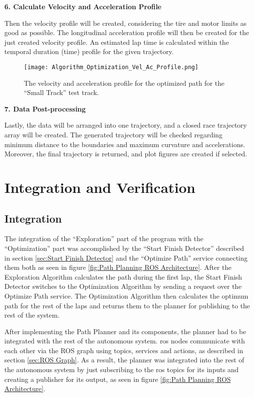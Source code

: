 \textbf{6. Calculate Velocity and Acceleration Profile}

Then the velocity profile will be created, considering the tire and motor limits as good as possible. The longitudinal acceleration profile will then be created for the just created velocity profile. An estimated lap time is calculated within the temporal duration (time) profile for the given trajectory.
\begin{figure}[H]
    \centering
    \texttt{[image: Algorithm\_Optimization\_Vel\_Ac\_Profile.png]}
    \caption{The velocity and acceleration profile for the optimized path for the ``Small Track'' test track.}
    \label{fig:Optimization Algorithm Velocity and Acceleration Profile}
\end{figure}

\textbf{7. Data Post-processing}

Lastly, the data will be arranged into one trajectory, and a closed race trajectory array will be created. The generated trajectory will be checked regarding minimum distance to the boundaries and maximum curvature and accelerations. Moreover, the final trajectory is returned, and plot figures are created if selected.

\pagebreak

\section{Integration and Verification} \label{sec:Integration and Verification}

\subsection{Integration} \label{sec:Integration}
The integration of the ``Exploration'' part of the program with the ``Optimization'' part was accomplished by the ``Start Finish Detector'' described in section \ref{sec:Start Finish Detector} and the ``Optimize Path'' service connecting them both as seen in figure \ref{fig:Path Planning ROS Architecture}. After the Exploration Algorithm calculates the path during the first lap, the Start Finish Detector switches to the Optimization Algorithm by sending a request over the Optimize Path service. The Optimization Algorithm then calculates the optimum path for the rest of the laps and returns them to the planner for publishing to the rest of the system.

After implementing the Path Planner and its components, the planner had to be integrated with the rest of the autonomous system.
\acrshort{ros} nodes communicate with each other via the ROS graph using topics, services and actions, as described in section \ref{sec:ROS Graph}. As a result, the planner was integrated into the rest of the autonomous system by just subscribing to the \acrshort{ros} topics for its inputs and creating a publisher for its output, as seen in figure \ref{fig:Path Planning ROS Architecture}.

